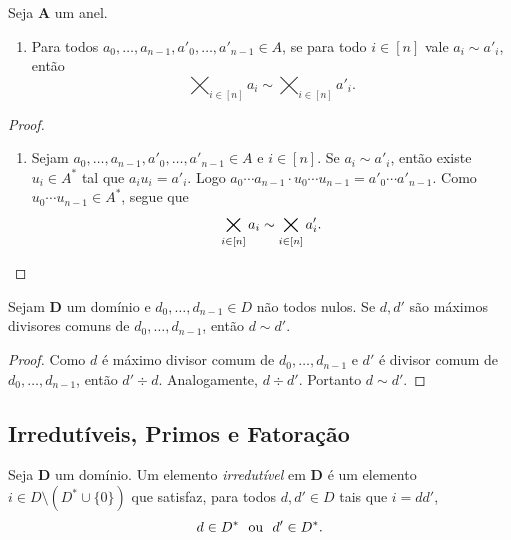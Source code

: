 \begin{prop}
Seja $\bm A$ um anel.
	\begin{enumerate}
	\item Para todos $a_0,\ldots,a_{n-1},a'_0,\ldots,a'_{n-1} \in A$, se para todo $i \in [n]$ vale $a_i \sim a'_i$, então
		\begin{equation*}
		\bigtimes_{i \in [n]} a_i \sim \bigtimes_{i \in [n]} a'_i.
		\end{equation*}
	\end{enumerate}
\end{prop}
\begin{proof}
	\begin{enumerate}
	\item Sejam $a_0,\ldots,a_{n-1},a'_0,\ldots,a'_{n-1} \in A$ e $i \in [n]$. Se $a_i \sim a'_i$, então existe $u_i \in A^*$ tal que $a_iu_i = a'_i$. Logo $a_0 \cdots a_{n-1} \cdot u_0 \cdots u_{n-1} = a'_0 \cdots a'_{n-1}$. Como $u_0 \cdots u_{n-1} \in A^*$, segue que
		\begin{equation*}
		\bigtimes_{i \in [n]} a_i \sim \bigtimes_{i \in [n]} a'_i. \qedhere
		\end{equation*}
	\end{enumerate}
\end{proof}

\begin{prop}
Sejam $\bm D$ um domínio e $d_0, \ldots, d_{n-1} \in D$ não todos nulos. Se $d,d'$ são máximos divisores comuns de $d_0,\ldots,d_{n-1}$, então $d \sim d'$.
\end{prop}
\begin{proof}
Como $d$ é máximo divisor comum de $d_0,\ldots,d_{n-1}$ e $d'$ é divisor comum de $d_0,\ldots,d_{n-1}$, então $d' \div d$. Analogamente, $d \div d'$.
Portanto $d \sim d'$.
\end{proof}

\subsection{Irredutíveis, Primos e Fatoração}

\begin{defi}
Seja $\bm D$ um domínio. Um elemento \emph{irredutível} em $\bm D$ é um elemento $i \in D \setminus (D^* \cup \{0\})$ que satisfaz, para todos $d,d' \in D$ tais que $i=dd'$,
		\begin{equation*}
		d \in D^* \text{\ \ ou\ \ } d' \in D^*.
		\end{equation*}
\end{defi}

